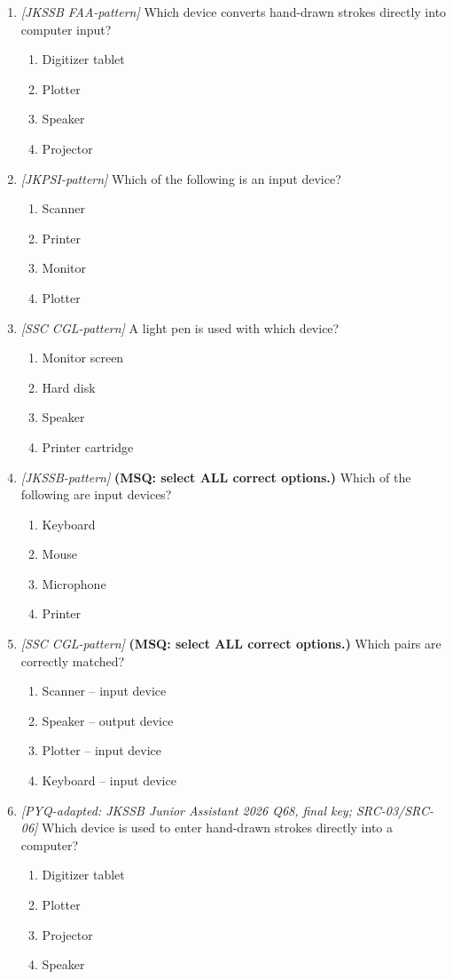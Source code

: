 \begin{enumerate}[label=\textbf{Q\arabic*.}, leftmargin=*]
\item \textit{[JKSSB FAA-pattern]} Which device converts hand-drawn strokes directly into computer input?
  \begin{enumerate}[label=\Alph*.]
    \item Digitizer tablet
    \item Plotter
    \item Speaker
    \item Projector
  \end{enumerate}
\item \textit{[JKPSI-pattern]} Which of the following is an input device?
  \begin{enumerate}[label=\Alph*.]
    \item Scanner
    \item Printer
    \item Monitor
    \item Plotter
  \end{enumerate}
\item \textit{[SSC CGL-pattern]} A light pen is used with which device?
  \begin{enumerate}[label=\Alph*.]
    \item Monitor screen
    \item Hard disk
    \item Speaker
    \item Printer cartridge
  \end{enumerate}
\item \textit{[JKSSB-pattern]} \textbf{(MSQ: select ALL correct options.)} Which of the following are input devices?
  \begin{enumerate}[label=\Alph*.]
    \item Keyboard
    \item Mouse
    \item Microphone
    \item Printer
  \end{enumerate}
\item \textit{[SSC CGL-pattern]} \textbf{(MSQ: select ALL correct options.)} Which pairs are correctly matched?
  \begin{enumerate}[label=\Alph*.]
    \item Scanner -- input device
    \item Speaker -- output device
    \item Plotter -- input device
    \item Keyboard -- input device
  \end{enumerate}
\item \textit{[PYQ-adapted: JKSSB Junior Assistant 2026 Q68, final key; SRC-03/SRC-06]} Which device is used to enter hand-drawn strokes directly into a computer?
  \begin{enumerate}[label=\Alph*.]
\item Digitizer tablet
   \item Plotter
   \item Projector
   \item Speaker
  \end{enumerate}


\end{enumerate}
